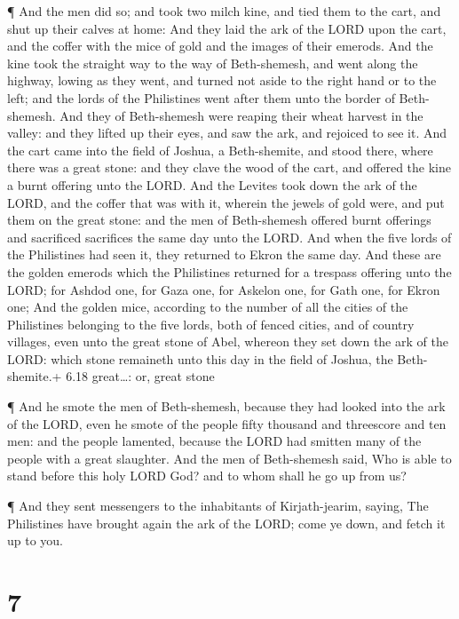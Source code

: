  ¶ And the men did so; and took two milch kine, and tied
them to the cart, and shut up their calves at home:  And
they laid the ark of the LORD upon the cart, and the coffer with the
mice of gold and the images of their emerods.  And the kine
took the straight way to the way of Beth-shemesh, and went along the
highway, lowing as they went, and turned not aside to the right hand or
to the left; and the lords of the Philistines went after them unto the
border of Beth-shemesh.  And they of Beth-shemesh were
reaping their wheat harvest in the valley: and they lifted up their
eyes, and saw the ark, and rejoiced to see it.  And the
cart came into the field of Joshua, a Beth-shemite, and stood there,
where there was a great stone: and they clave the wood of the cart, and
offered the kine a burnt offering unto the LORD.  And the
Levites took down the ark of the LORD, and the coffer that was with it,
wherein the jewels of gold were, and put them on the great stone: and
the men of Beth-shemesh offered burnt offerings and sacrificed
sacrifices the same day unto the LORD.  And when the five
lords of the Philistines had seen it, they returned to Ekron the same
day.  And these are the golden emerods which the
Philistines returned for a trespass offering unto the LORD; for Ashdod
one, for Gaza one, for Askelon one, for Gath one, for Ekron one;
 And the golden mice, according to the number of all the
cities of the Philistines belonging to the five lords, both of fenced
cities, and of country villages, even unto the great stone of Abel,
whereon they set down the ark of the LORD: which stone remaineth unto
this day in the field of Joshua, the Beth-shemite.+ 6.18 great\ldots:
or, great stone

 ¶ And he smote the men of Beth-shemesh, because they had
looked into the ark of the LORD, even he smote of the people fifty
thousand and threescore and ten men: and the people lamented, because
the LORD had smitten many of the people with a great slaughter.
 And the men of Beth-shemesh said, Who is able to stand
before this holy LORD God? and to whom shall he go up from us?

 ¶ And they sent messengers to the inhabitants of
Kirjath-jearim, saying, The Philistines have brought again the ark of
the LORD; come ye down, and fetch it up to you.

\hypertarget{section-6}{%
\section{7}\label{section-6}}

